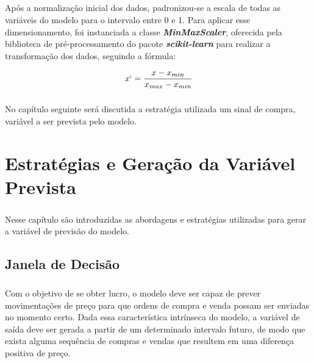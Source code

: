 \documentclass[grad,numbers]{coppe}
\begin{document}
        \paragraph{}Após a normalização inicial dos dados, padronizou-se a escala de todas as variáveis do modelo para o intervalo entre 0 e 1. Para aplicar esse dimensionamento, foi instanciada a classe \textbf{\textit{MinMaxScaler}}, oferecida pela biblioteca de pré-processamento do pacote \textbf{\textit{scikit-learn}} para realizar a transformação dos dados, seguindo a fórmula:
        
        \begin{equation}
            x` = \frac{x - x_{min}}{x_{max} - x_{min}}
        \end{equation}
        
        \paragraph{}No capítulo seguinte será discutida a estratégia utilizada um sinal de compra, variável a ser prevista pelo modelo.
        
        
    \chapter{Estratégias e Geração da Variável Prevista} 
        
        \paragraph{}Nesse capítulo são introduzidas as abordagens e estratégias utilizadas para gerar a variável de previsão do modelo.
        
        \section{Janela de Decisão}
        
            \paragraph{}Com o objetivo de se obter lucro, o modelo deve ser capaz de prever movimentações de preço para que ordens de compra e venda possam ser enviadas no momento certo. Dada essa característica intrínseca do modelo, a variável de saída deve ser gerada a partir de um determinado intervalo futuro, de modo que exista alguma sequência de compras e vendas que resultem em uma diferença positiva de preço.
            
\end{document}
